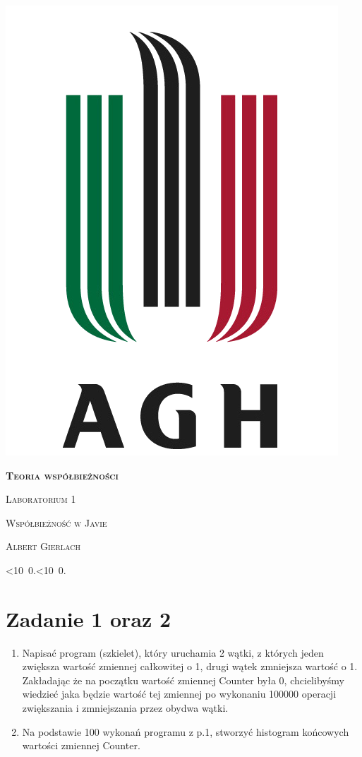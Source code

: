 \documentclass[12pt]{article}
\def\mydate{\leavevmode\hbox{\twodigits\day.\twodigits\month.\the\year}}
\def\twodigits#1{\ifnum#1<10 0\fi\the#1}
\begin{document}
\thispagestyle{empty}
\begin{center}
\begin{minipage}{0.75\linewidth}
    \centering
    \includegraphics[width=0.45\linewidth]{agh_logo2.png}
    \par
    \vspace{2cm}
    {\bfseries{\scshape{\Huge  Teoria współbieżności}}}
    \par
    \vspace{2cm}
    {\scshape{\Large Laboratorium 1}}
    \par
    \vspace{0.4cm}
    {\scshape{\Large Współbieżność w Javie}}
    \par
    \vspace{3cm}

    {\scshape{\Large Albert Gierlach}}\par
    \vspace{1cm}

    {\Large \mydate}
\end{minipage}
\end{center}
\clearpage



\section{Zadanie 1 oraz 2}
\begin{enumerate}
    \item Napisać program (szkielet), który uruchamia 2 wątki, z których jeden zwiększa wartość zmiennej całkowitej o 1, drugi wątek zmniejsza wartość o 1. Zakładając że na początku wartość zmiennej Counter była 0, chcielibyśmy wiedzieć jaka będzie wartość tej zmiennej po wykonaniu 100000 operacji zwiększania i zmniejszania przez obydwa wątki.
    \item Na podstawie 100 wykonań programu z p.1, stworzyć histogram końcowych wartości zmiennej Counter.
\end{enumerate}
  
\end{document}

